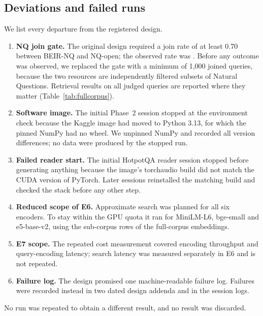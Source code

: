 \subsection{Deviations and failed runs}\label{sec:deviations}
We list every departure from the registered design.
\begin{enumerate}
\item \textbf{NQ join gate.} The original design required a join rate of at least 0.70 between BEIR-NQ and NQ-open; the observed rate was . Before any outcome was observed, we replaced the gate with a minimum of 1,000 joined queries, because the two resources are independently filtered subsets of Natural Questions. Retrieval results on all  judged queries are reported where they matter (Table~\ref{tab:fullcorpus}).
\item \textbf{Software image.} The initial Phase~2 session stopped at the environment check because the Kaggle image had moved to Python 3.13, for which the pinned NumPy had no wheel. We unpinned NumPy and recorded all version differences; no data were produced by the stopped run.
\item \textbf{Failed reader start.} The initial HotpotQA reader session stopped before generating anything because the image's torchaudio build did not match the CUDA version of PyTorch. Later sessions reinstalled the matching build and checked the stack before any other step.
\item \textbf{Reduced scope of E6.} Approximate search was planned for all six encoders. To stay within the GPU quota it ran for MiniLM-L6, bge-small and e5-base-v2, using the sub-corpus rows of the full-corpus embeddings.
\item \textbf{E7 scope.} The repeated cost measurement covered encoding throughput and query-encoding latency; search latency was measured separately in E6 and is not repeated.
\item \textbf{Failure log.} The design promised one machine-readable failure log. Failures were recorded instead in two dated design addenda and in the session logs.
\end{enumerate}
No run was repeated to obtain a different result, and no result was discarded.
